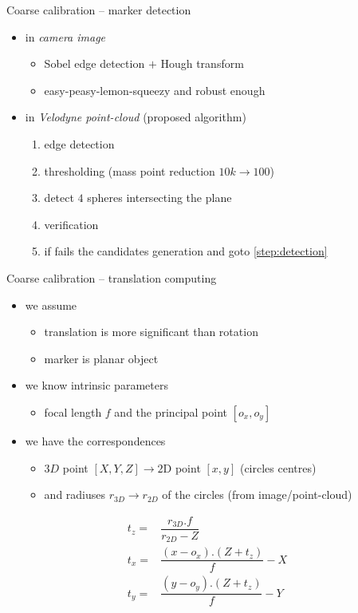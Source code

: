 \documentclass[pdf]{beamer}
\begin{document}
	\begin{frame}{Coarse calibration -- marker detection}
		\begin{itemize}
			\item in \emph{camera image}
			\begin{itemize}
				\item Sobel edge detection $+$ Hough transform
				\item easy-peasy-lemon-squeezy and robust enough
			\end{itemize}
			\item in \emph{Velodyne point-cloud} (proposed algorithm)
			\begin{enumerate}
				\item edge detection
				\item thresholding (mass point reduction $10k \rightarrow 100$)
				\item detect $4$ spheres intersecting the plane \label{step:detection}
				\item verification
				\item if fails the candidates generation and goto \ref{step:detection}
			\end{enumerate}
		\end{itemize}
	\end{frame}

	\begin{frame}{Coarse calibration -- translation computing}
		\begin{itemize}
			\item we assume
			\begin{itemize}
				\item translation is more significant than rotation
				\item marker is planar object
			\end{itemize}
			
			\item we know intrinsic parameters 
			\begin{itemize}
				\item focal length $f$ and the principal point $[o_x, o_y]$
			\end{itemize}
			
			\item we have the correspondences
			\begin{itemize}
				\item 3$D$ point $[X, Y, Z] \rightarrow 2$D point $[x, y]$ (circles centres)
				\item and radiuses $r_{3D} \rightarrow r_{2D}$ of the circles (from image/point-cloud)
			\end{itemize} 
		\end{itemize}
		\begin{eqnarray}
			t_z =& \dfrac{r_{3D}.f}{r_{2D} - Z} \\
			t_x =& \dfrac{(x - o_x).(Z + t_z)}{f} - X   \\
			t_y =& \dfrac{(y - o_y).(Z + t_z)}{f} - Y
		\end{eqnarray}
	\end{frame}
	
\end{document}
